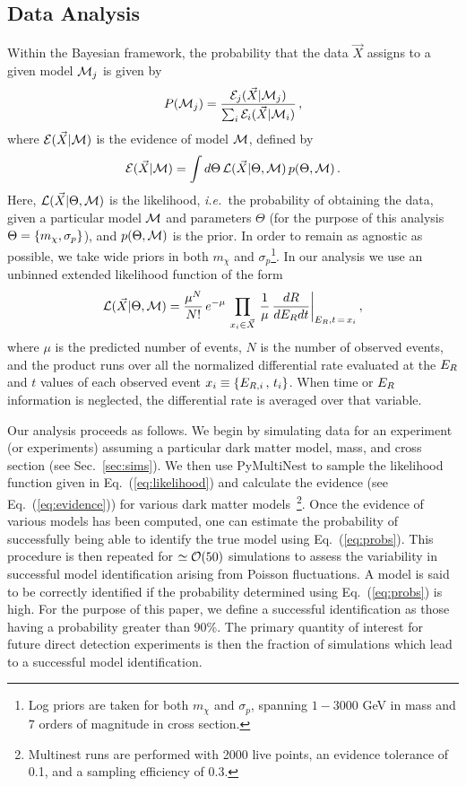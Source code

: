 \documentclass[11pt]{article}
\newcommand{\ie}{{\it i.e.~}}  \newcommand{\eg}{{\it e.g.~}}
\newcommand{\Eq}[1]{Eq.~(\ref{#1})} \newcommand{\Eqs}[2]{Eqs.~(\ref{#1}) and (\ref{#2})} \newcommand{\Eqm}[2]{Eqs.~(\ref{#1}) through (\ref{#2})}
\begin{document}
\subsection{Data Analysis}

Within the Bayesian framework, the probability that the data $\vec{X}$ assigns to a given model ${\cal M}_j$ is given by
\begin{equation}\label{eq:probs}
P({\cal M}_j) = \frac{{\cal E}_j(\vec{X}|{\cal M}_j)}{\sum_i {\cal E}_i(\vec{X}|{\cal M}_i)} \, ,
\end{equation}
where ${\cal E}(\vec{X}|{\cal M})$ is the evidence of model ${\cal M}$, defined by
\begin{equation}\label{eq:evidence}
{\cal E}(\vec{X}|{\cal M}) = \int d\Theta \, {\cal L}(\vec{X}|\Theta,{\cal M}) \, p(\Theta,{\cal M}) \, .
\end{equation}
Here, ${\cal L}(\vec{X}|\Theta,{\cal M})$ is the likelihood, \ie the probability of obtaining the data, given a particular model ${\cal M}$ and parameters $\Theta$ (for the purpose of this analysis $\Theta = \left\{ m_\chi, \sigma_p \right\}$), and $p(\Theta, {\cal M})$ is the prior. In order to remain as agnostic as possible, we take wide priors in both $m_\chi$ and $\sigma_p$\footnote{Log priors are taken for both $m_\chi$ and $\sigma_p$, spanning $1-3000$ GeV in mass and $7$ orders of magnitude in cross section.}. In our analysis we use an unbinned extended likelihood function of the form
\begin{equation}\label{eq:likelihood}
{\cal L}(\vec{X}|\Theta,{\cal M}) = \frac{\mu^N}{N!} \, e^{-\mu} \, \prod_{x_i \in \vec{X}}\, \frac{1}{\mu} \, \frac{dR}{dE_R dt} \bigg|_{E_R,t \, = \, x_i} \, ,
\end{equation}
where $\mu$ is the predicted number of events, $N$ is the number of observed events, and the product runs over all the normalized differential rate evaluated at the $E_R$ and $t$ values of each observed event $x_i \equiv \left\{ E_{R,i} \, , \, t_i \right\}$. When time or $E_R$ information is neglected, the differential rate is averaged over that variable. 


Our analysis proceeds as follows. We begin by simulating data for an experiment (or experiments) assuming a particular dark matter model, mass, and cross section (see Sec.~\ref{sec:sims}). We then use PyMultiNest to sample the likelihood function given in \Eq{eq:likelihood} and calculate the evidence (see \Eq{eq:evidence}) for various dark matter models~\cite{pymultinest,Feroz:2008xx}\footnote{Multinest runs are performed with 2000 live points, an evidence tolerance of 0.1, and a sampling efficiency of 0.3.}. Once the evidence of various models has been computed, one can estimate the probability of successfully being able to identify the true model using \Eq{eq:probs}. This procedure is then repeated for $\simeq {\cal O}(50)$ simulations to assess the variability in successful model identification arising from Poisson fluctuations. A model is said to be correctly identified if the probability determined using \Eq{eq:probs} is high. For the purpose of this paper, we define a successful identification as those having a probability greater than 90\%. The primary quantity of interest for future direct detection experiments is then the fraction of simulations which lead to a successful model identification.    
\end{document}
